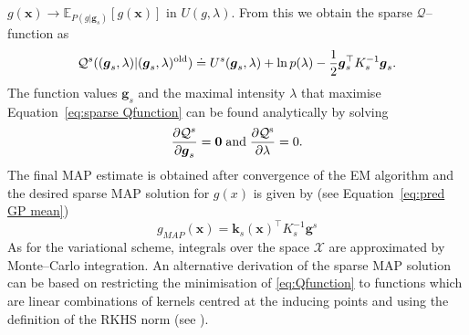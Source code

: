 \documentclass[twoside,11pt]{article}
\newcommand{\EE}[2]{\mathbb{E}_{#1}\left[ #2 \right]}
\newcommand{\bs}[1]{\boldsymbol{#1}}
\newcommand{\bx}{\boldsymbol{x}}
\newcommand{\bg}{\boldsymbol{g}}
\newcommand{\calS}{\mathcal{S}}
\newcommand{\X}{\mathcal{X}}
\newcommand{\Q}{\mathcal{Q}}
\begin{document}
$g(\bx) \rightarrow \EE{P(g\vert \bg_s)}{g(\bx)}$ in $U(g,\lambda)$.
From this we obtain the sparse $\Q$--function as
\begin{equation}\label{eq:sparse Qfunction}
\Q^{s}((\bg_s,\lambda)\vert (\bg_s,\lambda)^{\rm old}) \doteq U^s(\bg_s,\lambda) + \ln p(\lambda) - \frac{1}{2}\bg_s^\top K^{-1}_s \bg_s.
\end{equation}
The function values $\bg_s$ and the maximal intensity $\lambda$ that maximise Equation~\eqref{eq:sparse Qfunction} can be found analytically by solving
\begin{equation}\label{eq:Mstep}
\frac{\partial \Q^s}{\partial \bg_s} = \bs{0}\;\rm{and}\;\frac{\partial \Q^s}{\partial \lambda} = 0. 
\end{equation}
The final MAP estimate is obtained after convergence of the EM algorithm and 
the desired sparse MAP solution for $g(x)$ is given by
(see Equation~\eqref{eq:pred GP mean})
\begin{equation}
g_{MAP}(\bx)= \bs{k}_s(\bx)^\top K_s^{-1}\bg^s
\end{equation}
As for the variational scheme, integrals over the space $\X$ are approximated by Monte--Carlo integration.
An alternative derivation of the sparse MAP solution can be based on 
 restricting the minimisation of \eqref{eq:Qfunction} to functions which are linear combinations of kernels 
 centred at the inducing points and using the definition of the RKHS norm
(see \citep[chap. 6]{rasmussen2006gaussian}). 
\end{document}
